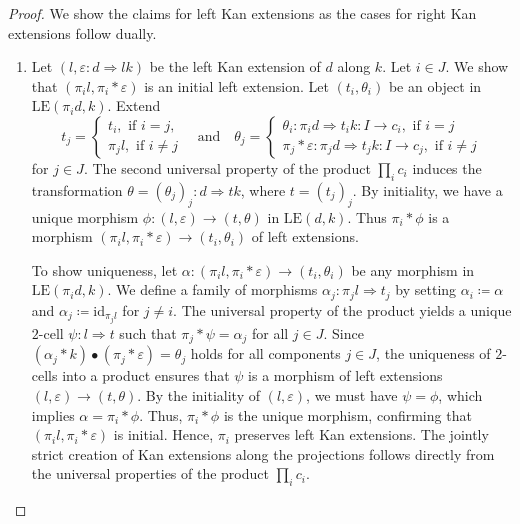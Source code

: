 \documentclass[11pt]{article}
\theoremstyle{plain}
\theoremstyle{definition}
\numberwithin{equation}{section}
\newcommand{\id}{\mathrm{id}}
\newcommand{\LE}{\mathrm{LE}}
\begin{document}
\begin{proof} We show the claims for left Kan extensions as the cases for right Kan extensions follow dually.
   \begin{enumerate}

   \item Let $(l,\varepsilon\colon d\Rightarrow lk)$ be the left Kan extension of $d$ along $k$. Let $i\in J$. We show that $(\pi_il, \pi_i*\varepsilon)$ is an initial left extension. Let $(t_i,\theta_i)$ be an object in $\LE(\pi_id,k)$. Extend 
       $$
       t_j = \begin{cases}
           t_i,\text{ if } i = j,\\
           \pi_jl, \text{ if } i\neq j
       \end{cases}\quad\text{and}\quad\theta_j =\begin{cases}
           \theta_i\colon \pi_id\Rightarrow t_ik\colon I\to c_i,\text{ if }i = j\\
           \pi_j*\varepsilon\colon \pi_jd\Rightarrow t_jk\colon I\to c_j,\text{ if } i\neq j
       \end{cases}
       $$
       for $j\in J$. The second universal property of the product $\prod_i c_i$ induces the transformation $\theta = (\theta_j)_j\colon d\Rightarrow tk$, where $t = (t_j)_j$. By initiality, we have a unique morphism $\phi\colon (l,\varepsilon)\to (t, \theta)$ in $\LE(d,k)$. Thus $\pi_i*\phi$ is a morphism $(\pi_il, \pi_i*\varepsilon)\to (t_i,\theta_i)$ of left extensions. 

       To show uniqueness, let $\alpha\colon (\pi_il,\pi_i*\varepsilon)\to (t_i,\theta_i)$ be any morphism in $\LE(\pi_id,k)$. We define a family of morphisms $\alpha_j \colon \pi_j l \Rightarrow t_j$ by setting $\alpha_i \coloneqq \alpha$ and $\alpha_j \coloneqq \id_{\pi_j l}$ for $j \neq i$. The universal property of the product yields a unique $2$-cell $\psi \colon l \Rightarrow t$ such that $\pi_j * \psi = \alpha_j$ for all $j \in J$. Since $(\alpha_j * k) \bullet (\pi_j * \varepsilon) = \theta_j$ holds for all components $j \in J$, the uniqueness of $2$-cells into a product ensures that $\psi$ is a morphism of left extensions $(l, \varepsilon) \to (t, \theta)$. By the initiality of $(l,\varepsilon)$, we must have $\psi = \phi$, which implies $\alpha = \pi_i * \phi$. Thus, $\pi_i * \phi$ is the unique morphism, confirming that $(\pi_i l, \pi_i * \varepsilon)$ is initial. Hence, $\pi_i$ preserves left Kan extensions. The jointly strict creation of Kan extensions along the projections follows directly from the universal properties of the product $\prod_i c_i$.
       

\end{enumerate}
\end{proof}
\end{document}
